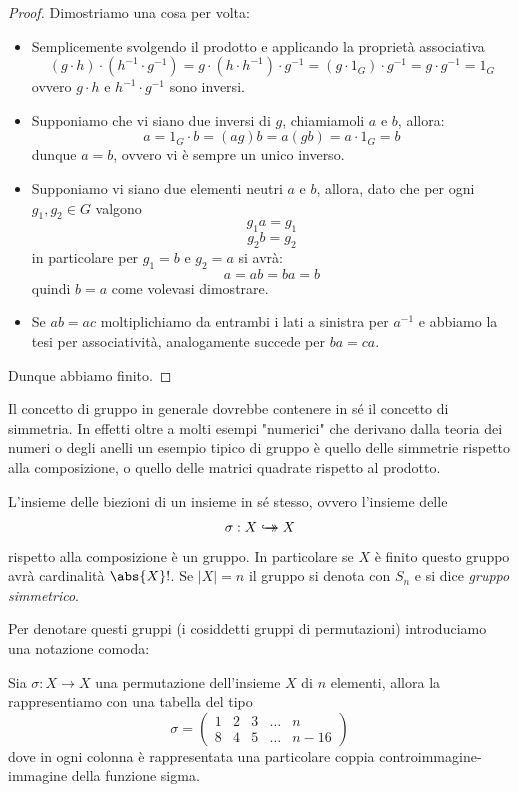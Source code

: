 \documentclass[11pt]{scrartcl}
\newcommand{\bij}{\hookrightarrow\mathrel{\mspace{-15mu}}\rightarrow}
\begin{document}
	\begin{proof}
		Dimostriamo una cosa per volta:
		\begin{itemize}
			\item Semplicemente svolgendo il prodotto e applicando la proprietà associativa
			$$(g\cdot h) \cdot (h^{-1} \cdot g^{-1})=g\cdot \left(h\cdot h^{-1}\right)\cdot g^{-1}=(g\cdot 1_G)\cdot g^{-1}=g\cdot g^{-1}=1_G$$
			ovvero $g\cdot h$ e $h^{-1} \cdot g^{-1}$ sono inversi.
			\item Supponiamo che vi siano due inversi di $g$, chiamiamoli $a$ e $b$, allora:
			$$a=1_G\cdot b=(ag)b=a(gb)=a\cdot 1_G=b$$
			dunque $a=b$, ovvero vi è sempre un unico inverso.
			\item Supponiamo vi siano due elementi neutri $a$ e $b$, allora, dato che per ogni $g_1,g_2\in G$ valgono
			$$g_1a=g_1$$
			$$g_2b=g_2$$
			in particolare per $g_1=b$ e $g_2=a$ si avrà:
			$$a=ab=ba=b$$
			quindi $b=a$ come volevasi dimostrare.
			\item Se $ab=ac$ moltiplichiamo da entrambi i lati a sinistra per $a^{-1}$ e abbiamo la tesi per associatività, analogamente succede per $ba=ca$.
		\end{itemize}
		Dunque abbiamo finito. 
	\end{proof}
	Il concetto di gruppo in generale dovrebbe contenere in sé il concetto di simmetria. In effetti oltre a molti esempi "numerici" che derivano dalla teoria dei numeri o degli anelli un esempio tipico di gruppo è quello delle simmetrie rispetto alla composizione, o quello delle matrici quadrate rispetto al prodotto.
	\begin{example}\label{gruppo simmetrico}
		L'insieme delle biezioni di un insieme in sé stesso, ovvero l'insieme delle 
		$$\sigma:X\bij X$$
		rispetto alla composizione è un gruppo. In particolare se $X$ è finito questo gruppo avrà cardinalità $\abs{X}!$. Se $|X|=n$ il gruppo si denota con $S_n$ e si dice \textit{gruppo simmetrico}. 
	\end{example}
	Per denotare questi gruppi (i cosiddetti gruppi di permutazioni) introduciamo una notazione comoda:
	\begin{definition}
		Sia $\sigma:X\to X$ una permutazione dell'insieme $X$ di $n$ elementi, allora la rappresentiamo con una tabella del tipo
		$$\sigma = 
		\begin{pmatrix}
			1 & 2 & 3 & \dots & n \\
			8 & 4 & 5 & \dots & n-16
		\end{pmatrix}
		$$
		dove in ogni colonna è rappresentata una particolare coppia controimmagine-immagine della funzione sigma.
	\end{definition}
\end{document}
